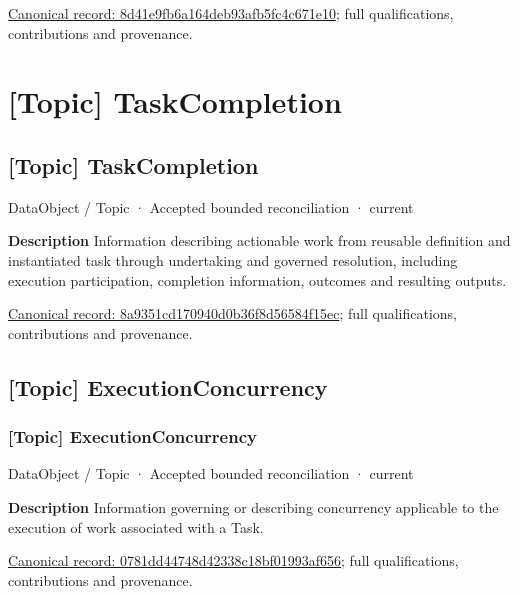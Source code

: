 {\footnotesize \href{../../../../continuum/application/data-object/topic/8d41e9fb6a164deb93afb5fc4c671e10.md}{Canonical record: 8d41e9fb6a164deb93afb5fc4c671e10}; full qualifications, contributions and provenance.}\par
\section{[Topic] TaskCompletion}

\subsection{[Topic] TaskCompletion}

\label{element:8a9351cd170940d0b36f8d56584f15ec}
{\small DataObject / Topic · Accepted bounded reconciliation · current}\par

\textbf{Description} 
Information describing actionable work from reusable definition and instantiated task through undertaking and governed resolution, including execution participation, completion information, outcomes and resulting outputs.


{\footnotesize \href{../../../../continuum/application/data-object/topic/8a9351cd170940d0b36f8d56584f15ec.md}{Canonical record: 8a9351cd170940d0b36f8d56584f15ec}; full qualifications, contributions and provenance.}\par
\subsection{[Topic] ExecutionConcurrency}

\subsubsection{[Topic] ExecutionConcurrency}

\label{element:0781dd44748d42338c18bf01993af656}
{\small DataObject / Topic · Accepted bounded reconciliation · current}\par

\textbf{Description}
Information governing or describing concurrency applicable to the execution of work associated with a Task.


{\footnotesize \href{../../../../continuum/application/data-object/topic/0781dd44748d42338c18bf01993af656.md}{Canonical record: 0781dd44748d42338c18bf01993af656}; full qualifications, contributions and provenance.}\par
